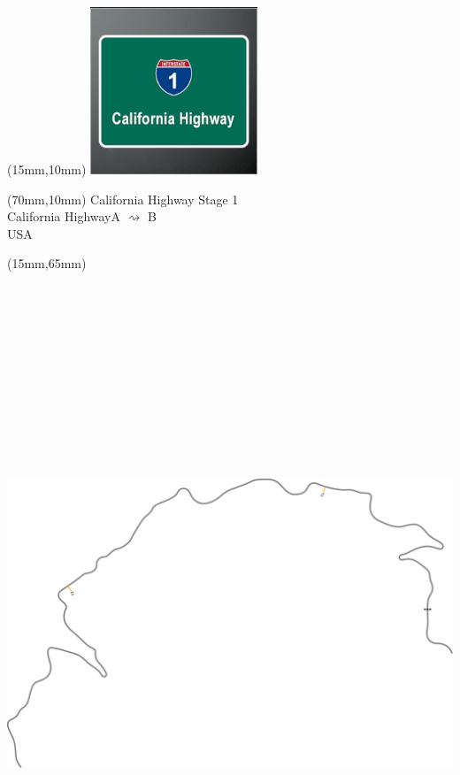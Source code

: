 \null\newpage
\begin{textblock*}{50mm}(15mm,10mm)%
\includegraphics[width=50mm]{LG/2015-05-20_00077.png}
\end{textblock*}
\begin{textblock*}{130mm}(70mm,10mm)%
{\fontsize{20}{20}\selectfont California Highway Stage 1\\}
{\fontsize{16}{16}\selectfont California Highway\hfill A $\rightsquigarrow$ B\\}
{\fontsize{12}{12}\selectfont USA\\}
\end{textblock*}
\begin{textblock*}{185mm}(15mm,65mm)%
\centering
\mbox{\includegraphics[width=185mm,height=210mm,keepaspectratio]{PT/CAHIS1.pdf}}
\end{textblock*}
